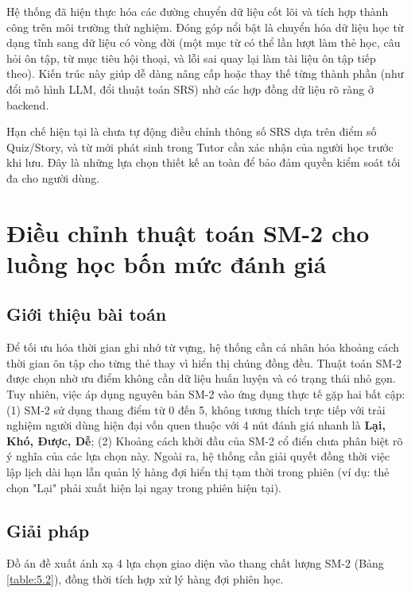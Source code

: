 \documentclass[../DoAn.tex]{subfiles}
\begin{document}
Hệ thống đã hiện thực hóa các đường chuyển dữ liệu cốt lõi và tích hợp thành công trên môi trường thử nghiệm. Đóng góp nổi bật là chuyển hóa dữ liệu học từ dạng tĩnh sang dữ liệu có vòng đời (một mục từ có thể lần lượt làm thẻ học, câu hỏi ôn tập, từ mục tiêu hội thoại, và lỗi sai quay lại làm tài liệu ôn tập tiếp theo). Kiến trúc này giúp dễ dàng nâng cấp hoặc thay thế từng thành phần (như đổi mô hình LLM, đổi thuật toán SRS) nhờ các hợp đồng dữ liệu rõ ràng ở backend. 

Hạn chế hiện tại là chưa tự động điều chỉnh thông số SRS dựa trên điểm số Quiz/Story, và từ mới phát sinh trong Tutor cần xác nhận của người học trước khi lưu. Đây là những lựa chọn thiết kế an toàn để bảo đảm quyền kiểm soát tối đa cho người dùng.

\section{Điều chỉnh thuật toán SM-2 cho luồng học bốn mức đánh giá}
\label{section:5.2}

\subsection{Giới thiệu bài toán}
\label{subsection:5.2.1}

Để tối ưu hóa thời gian ghi nhớ từ vựng, hệ thống cần cá nhân hóa khoảng cách thời gian ôn tập cho từng thẻ thay vì hiển thị chúng đồng đều. Thuật toán SM-2 \cite{wozniak1990optimization} được chọn nhờ ưu điểm không cần dữ liệu huấn luyện và có trạng thái nhỏ gọn. Tuy nhiên, việc áp dụng nguyên bản SM-2 vào ứng dụng thực tế gặp hai bất cập: (1) SM-2 sử dụng thang điểm từ 0 đến 5, không tương thích trực tiếp với trải nghiệm người dùng hiện đại vốn quen thuộc với 4 nút đánh giá nhanh là \textbf{Lại, Khó, Được, Dễ}; (2) Khoảng cách khởi đầu của SM-2 cổ điển chưa phân biệt rõ ý nghĩa của các lựa chọn này. Ngoài ra, hệ thống cần giải quyết đồng thời việc lập lịch dài hạn lẫn quản lý hàng đợi hiển thị tạm thời trong phiên (ví dụ: thẻ chọn "Lại" phải xuất hiện lại ngay trong phiên hiện tại).

\subsection{Giải pháp}
\label{subsection:5.2.2}

Đồ án đề xuất ánh xạ 4 lựa chọn giao diện vào thang chất lượng SM-2 (Bảng \ref{table:5.2}), đồng thời tích hợp xử lý hàng đợi phiên học.
\end{document}
